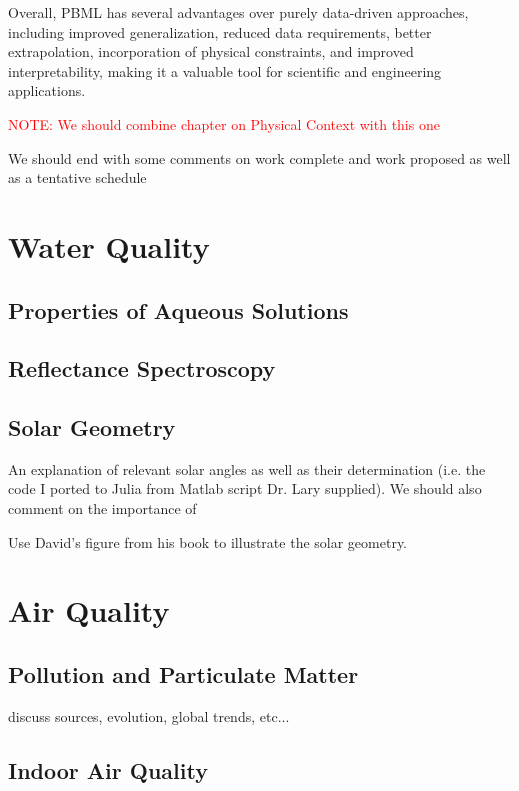 Overall, PBML has several advantages over purely data-driven approaches, including improved generalization, reduced data requirements, better extrapolation, incorporation of physical constraints, and improved interpretability, making it a valuable tool for scientific and engineering applications.



\textcolor{red}{NOTE: We should combine chapter on Physical Context with this one}

We should end with some comments on work complete and work proposed as well as a tentative schedule




\section{Water Quality}

\subsection{Properties of Aqueous Solutions}
\subsection{Reflectance Spectroscopy}
\subsection{Solar Geometry}

An explanation of relevant solar angles as well as their determination (i.e. the code I ported to Julia from Matlab script Dr. Lary supplied). We should also comment on the importance of

Use David's figure from his book to illustrate the solar geometry.



\section{Air Quality}
\subsection{Pollution and Particulate Matter}
discuss sources, evolution, global trends, etc...

\subsection{Indoor Air Quality}

